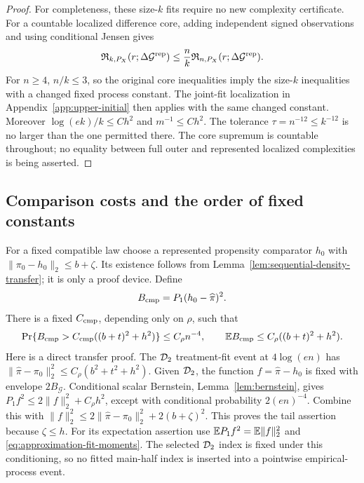 \begin{proof}
For completeness, these size-$k$ fits require no new complexity
certificate. For a countable localized difference core, adding
independent signed observations and using conditional Jensen gives
\[
 \mathfrak R_{k,P_X}(r;\Delta\mathcal G^{\rm rep})
 \le\frac nk\mathfrak R_{n,P_X}(r;\Delta\mathcal G^{\rm rep}).
\]
For $n\ge4$, $n/k\le3$, so the original core inequalities imply the
size-$k$ inequalities with a changed fixed process constant.
The joint-fit localization in Appendix~\ref{app:upper-initial} then
applies with the same changed constant. Moreover
$\log(ek)/k\le C h^2$ and $m^{-1}\le C h^2$.
The tolerance $\tau=n^{-12}\le k^{-12}$ is no larger than the
one permitted there. The core supremum is countable throughout; no
equality between full outer and represented localized complexities is
being asserted.
\end{proof}

\subsection{Comparison costs and the order of fixed constants}
\label{app:approximation-constants}

For a fixed compatible law choose a represented propensity comparator
$h_0$ with $\|\pi_0-h_0\|_2\le b+\zeta$. Its existence follows from
Lemma~\ref{lem:sequential-density-transfer}; it is only a proof device.
Define
\[
 B_{\rm cmp}=P_1(h_0-\widehat\pi)^2.
\]
There is a fixed $C_{\rm cmp}$, depending only on $\rho$, such that
\begin{equation}
 \Pr\{B_{\rm cmp}>C_{\rm cmp}((b+t)^2+h^2)\}
 \le C_\rho n^{-4},\qquad
 \mathbb E B_{\rm cmp}\le C_\rho((b+t)^2+h^2).
 \label{eq:approximation-comparator-cost}
\end{equation}
Here is a direct transfer proof. The $\mathcal D_2$ treatment-fit event at
$4\log(en)$ has
$\|\widehat\pi-\pi_0\|_2^2\le C_\rho(b^2+t^2+h^2)$.
Given $\mathcal D_2$, the function $f=\widehat\pi-h_0$ is fixed with
envelope $2B_{\mathcal G}$. Conditional scalar Bernstein,
Lemma~\ref{lem:bernstein}, gives
$P_1f^2\le2\|f\|_2^2+C_\rho h^2$, except with conditional
probability $2(en)^{-4}$. Combine this with
$\|f\|_2^2\le2\|\widehat\pi-\pi_0\|_2^2+2(b+\zeta)^2$.
This proves the tail assertion because $\zeta\le h$.
For its expectation assertion use
$\mathbb E P_1f^2=\mathbb E\|f\|_2^2$ and
\eqref{eq:approximation-fit-moments}. The selected $\mathcal D_2$ index is
fixed under this conditioning, so no fitted main-half index is inserted
into a pointwise empirical-process event.

